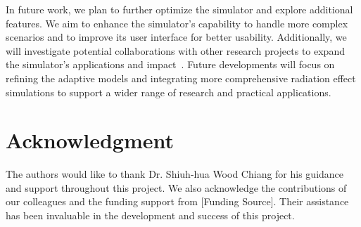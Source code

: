 \documentclass[conference]{IEEEtran}
\begin{document}
    In future work, we plan to further optimize the simulator and explore additional features.
    We aim to enhance the simulator's capability to handle more complex scenarios and to improve its user interface for better usability.
    Additionally, we will investigate potential collaborations with other research projects to expand the simulator's applications and impact~\cite{Pepper1990}.
    Future developments will focus on refining the adaptive models and integrating more comprehensive radiation effect simulations to support a wider range of research and practical applications.

    \section*{Acknowledgment}
    The authors would like to thank Dr. Shiuh-hua Wood Chiang for his guidance and support throughout this project.
    We also acknowledge the contributions of our colleagues and the funding support from [Funding Source].
    Their assistance has been invaluable in the development and success of this project.

    
    
\end{document}
